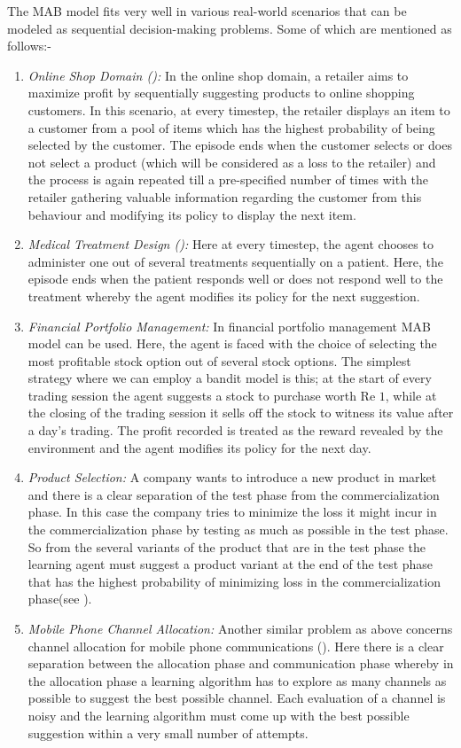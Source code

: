
The MAB model fits very well in various real-world scenarios that can be modeled as sequential decision-making problems. Some of which are mentioned as follows:-
\begin{enumerate}
\item \emph{Online Shop Domain (\cite{ghavamzadeh2015bayesian}):} In the online shop domain, a retailer aims to maximize profit by sequentially suggesting products to online shopping customers. In this scenario, at every timestep,  the retailer displays an item to a customer from a pool of items which has the highest probability of being selected by the customer. The episode ends when the customer selects or does not select a product (which will be considered as a loss to the retailer) and the process is again repeated till a pre-specified number of times with the retailer gathering valuable information regarding the customer from this behaviour and modifying its policy to display the next item.
\item \emph{Medical Treatment Design (\cite{thompson1933likelihood}):} Here at every timestep, the agent chooses to administer one out of several treatments sequentially on a patient. Here, the episode ends when the patient responds well or does not respond well to the treatment whereby the agent modifies its policy for the next suggestion.
\item \emph{Financial Portfolio Management:} In financial portfolio management MAB model can be used. Here, the agent is faced with the choice of selecting the most profitable stock option out of several stock options. The simplest strategy where we can employ a bandit model is this; at the start of every trading session the agent suggests a stock to purchase worth Re $1$, while at the closing of the trading session it sells off the stock to witness its value after a day's trading. The  profit recorded is treated as the reward revealed by the environment and the agent modifies its policy for the next day.
\item \emph{Product Selection:} A company wants to introduce a new product in market and there is a clear separation of the test phase from the commercialization phase. In this case the company tries to minimize the loss it might incur in the commercialization phase by testing as much as possible in the test phase. So from the several variants of the product that are in the test phase the learning agent must suggest a product variant at the end of the test phase that has the highest probability of minimizing loss in the commercialization phase(see \cite{bubeck2011pure}). 
\item \emph{Mobile Phone Channel Allocation:} Another similar problem as above concerns channel allocation for mobile phone communications (\cite{audibert2009exploration}). Here there is a clear separation between the allocation phase and communication phase whereby in the allocation phase a learning algorithm has to explore as many channels as possible to suggest the best possible channel. Each evaluation of a channel is noisy and the learning algorithm must come up with the best possible suggestion within a very small  number of attempts. 
\end{enumerate}

